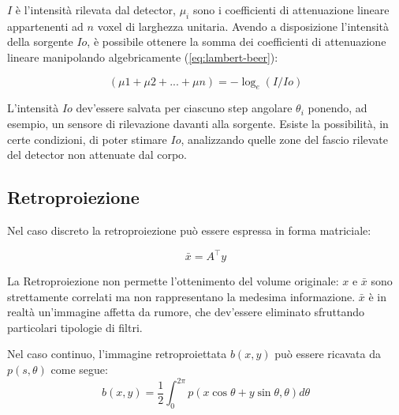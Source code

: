 \documentclass[a4paper,12pt, doubleside]{report}
\begin{document}
                    $I$ è l'intensità rilevata dal detector, $\mu_i$ sono i coefficienti di attenuazione lineare appartenenti ad $n$ voxel di larghezza unitaria. Avendo a disposizione l'intensità della sorgente $Io$, è possibile ottenere la somma dei coefficienti di attenuazione lineare manipolando algebricamente (\ref{eq:lambert-beer}):
                        
                    \begin{equation} \label{eq:normalization}
                        (\mu1 + \mu2 + ... + \mu n) = - \log_e{(I/Io)}
                    \end{equation}
                    
                    L'intensità $Io$ dev'essere salvata per ciascuno step angolare $\theta_i$ ponendo, ad esempio, un sensore di rilevazione davanti alla sorgente. Esiste la possibilità, in certe condizioni, di poter stimare $Io$, analizzando quelle zone del fascio rilevate del detector non attenuate dal corpo.
            
            \subsection{Retroproiezione}
                \par
                    Nel caso discreto la retroproiezione può essere espressa in forma matriciale:
                    
                    \begin{equation}
                        \bar{x} = A^\top y
                    \end{equation}
                    
                    La Retroproiezione non permette l'ottenimento del volume originale: $x$ e $\bar{x}$ sono strettamente correlati ma non rappresentano la medesima informazione. $\bar{x}$ è in realtà un'immagine affetta da rumore, che dev'essere eliminato sfruttando particolari tipologie di filtri.
                
                \bigskip
                \par
                    Nel caso continuo, l'immagine retroproiettata $b(x,y)$ può essere ricavata da $p(s,\theta)$ come segue:
                    \begin{equation}
                        b(x,y) = \frac{1}{2} \int_{0}^{2\pi} p(x \cos \theta + y \sin \theta , \theta ) d\theta
                    \end{equation}
                
\end{document}
